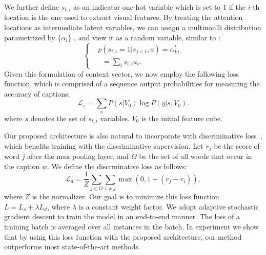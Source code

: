 \documentclass[10pt,twocolumn,letterpaper]{article}
\begin{document}
	We further define $s_{t,i}$ as an indicator one-hot variable which is set to $1$ if the $i$-{th} location is the one used to extract visual features. By treating the attention locations as intermediate latent variables, we can assign a multinoulli distribution parametrized by $\{\alpha _i\}$ , and view it as a random variable, similar to \cite{xu2015show}:
	\begin{equation}
	\left\{
	\begin{aligned}
	&p({s_{t,i}} = 1|{s_{j < t}},a) = {\alpha^t_{k}},\\
	&\mathop {{\hat z_t}}   = \sum\nolimits_i {{s_{t,i}}{a_i}}.
	\end{aligned}
	\right.
	\end{equation}
	Given this formulation of context vector, we now employ the following loss function, which is comprised of a sequence output probabilities for measuring the accuracy of captions:
	\begin{equation}
	\label{eq.objective}
	\mathcal{L}_s = \sum\limits_s {P(\left. s \right|V_0)} \log P(\left. y \right|s,V_0).
	\end{equation}
	where $s$ denotes the set of $s_{t,i}$ variables. $V_0$ is the initial feature cube.
	
	Our proposed architecture is also natural to incorporate with discriminative loss~\cite{fang2015captions}, which benefits training with the discriminative supervision. Let $r_j$ be the score of word $j$ after the max pooling layer, and $\Omega$ be the set of all words that occur in the caption $w$.  We define the discrminative loss as follows:
	\begin{equation}{\mathcal{L}_d} = \frac{1}{Z}\sum\limits_{j \in \Omega} {\sum\limits_{i \ne j} {\max (0,1 - ({r_j} - {r_i}))} },
	\end{equation}
	where $Z$ is the normalizer. Our goal is to minimize this loss function $L= L_s + \lambda L_d$, where $\lambda$ is a constant weight factor.
	We adopt adaptive stochastic gradient descent to train the model in an end-to-end manner. The loss of a training batch is averaged over all instances in the batch. In experiment we show that by using this loss function with the proposed architecture, our method outperforms most state-of-the-art methods.
	
\end{document}
